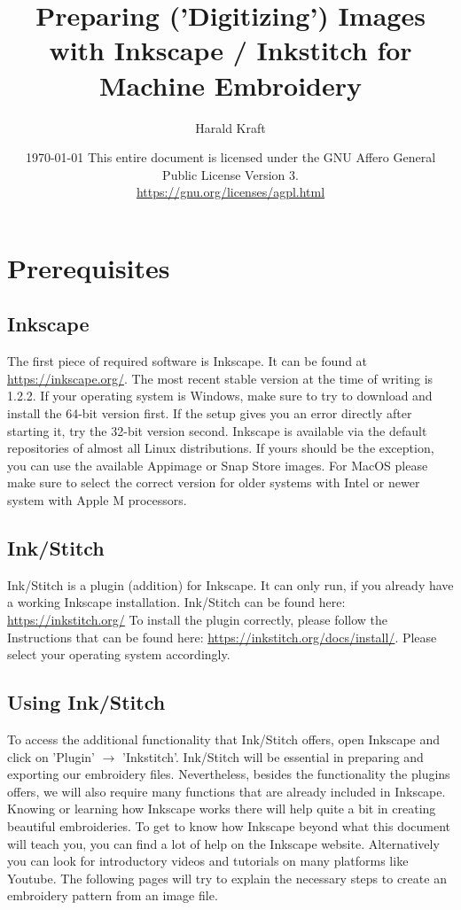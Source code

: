 \documentclass{article}
\title{
    Preparing ('Digitizing') Images with Inkscape / Inkstitch for\\
    Machine Embroidery}
\author{Harald Kraft}
\date{
    \today
    \bigbreak
    This entire document is licensed under the GNU Affero General Public License Version 3.\\
    \url{https://gnu.org/licenses/agpl.html}}
\begin{document}
    \maketitle

    \tableofcontents

    \pagebreak

    \section{Prerequisites}
        \subsection{Inkscape}
            The first piece of required software is Inkscape. It can be found at \url{https://inkscape.org/}. The most recent stable version at the time of writing is 1.2.2.
            If your operating system is Windows, make sure to try to download and install the 64-bit version first. If the setup gives you an error directly after starting it, try the 32-bit version second.
            Inkscape is available via the default repositories of almost all Linux distributions. If yours should be the exception, you can use the available Appimage or Snap Store images.
            For MacOS please make sure to select the correct version for older systems with Intel or newer system with Apple M processors.  

        \subsection{Ink/Stitch}

            Ink/Stitch is a plugin (addition) for Inkscape. It can only run, if you already have a working Inkscape installation. Ink/Stitch can be found here: \url{https://inkstitch.org/}
            To install the plugin correctly, please follow the Instructions that can be found here: \url{https://inkstitch.org/docs/install/}. Please select your operating system accordingly.

        \subsection{Using Ink/Stitch}
            
            To access the additional functionality that Ink/Stitch offers, open Inkscape and click on 'Plugin' $\rightarrow$ 'Inkstitch'.
            Ink/Stitch will be essential in preparing and exporting our embroidery files. Nevertheless, besides the functionality the plugins offers, we will also require many functions that are already included in Inkscape.
            Knowing or learning how Inkscape works there will help quite a bit in creating beautiful embroideries.
            To get to know how Inkscape beyond what this document will teach you, you can find a lot of help on the Inkscape website. Alternatively you can look for introductory videos and tutorials on many platforms like Youtube.
            \smallbreak
            The following pages will try to explain the necessary steps to create an embroidery pattern from an image file.
\end{document}
